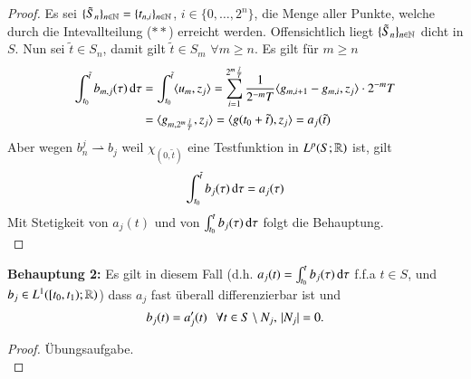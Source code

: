 \begin{proof}
    Es sei $\{\tilde S_n\}_{n\in\mathbb{N}}= \{t_{n,i}\}_{n\in\mathbb{N}}$, $i\in \{0, …, 2^n\}$, die Menge aller Punkte,
    welche durch die Intevallteilung ($**$) erreicht werden. Offensichtlich liegt $\{\tilde S_n\}
    _{n\in \mathbb{N}}$ dicht in $S$. Nun sei $\tilde t\in S_n$, damit gilt $\tilde t\in S_m$ $\forall m\geq n.$
    Es gilt für $m\geq n$
    \begin{align*}
        \int_{t_0}^{\tilde t} b_{m,j}(\tau) \, \mathrm{d} \tau &= \int_{t_0}^{\tilde t} \langle u_m,z_j\rangle 
        = \sum_{i=1}^{2^m\frac{\tilde t}T} \frac1{2^{-m}T}\langle g_{m,i+1} - g_{m,i}, z_j\rangle \cdot 2^{-m}T
        \\
        &= \langle g_{m, 2^m\frac{\tilde t}T}, z_j\rangle = \langle g(t_0+ \tilde t), z_j \rangle = a_j (\tilde t)
    \end{align*}
    Aber wegen $b_n^j\rightharpoonup b_j$ weil $\chi_{(0,\tilde t)}$ eine Testfunktion in $L^p(S;\mathbb{R})$
    ist, gilt
    \[
        \int_{t_0}^{\tilde t} b_j(\tau) \, \mathrm{d} \tau= a_j(\tau)
    \]
    Mit Stetigkeit von $a_j(t)$ und von $\int_{t_0}^t b_j(\tau)\, \mathrm{d}\tau$ folgt die Behauptung.\[ \] 
\end{proof}
\noindent\textbf{Behauptung 2:} Es gilt in diesem Fall (d.h. $a_j(t)=\int_{t_0}^tb_j(\tau)\, \mathrm{d}\tau$ f.f.a
$t\in S$, und $b_j\in L^1([t_0,t_1);\mathbb{R})$) dass $a_j$ fast überall differenzierbar ist und
\[
    b_j(t)=a'_j(t) \hspace{.25cm} \forall t\in S\setminus N_j, \, |N_j|=0.
\]
\begin{proof}
    Übungsaufgabe. \[ \]
\end{proof}

